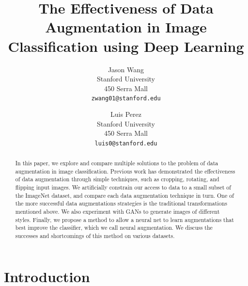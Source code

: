 \documentclass[10pt,twocolumn,letterpaper]{article}
\begin{document}
\title{The Effectiveness of Data Augmentation in Image Classification using Deep Learning}

\author{Jason Wang\\
Stanford University\\
450 Serra Mall\\
{\tt\small zwang01@stanford.edu}
\and
Luis Perez\\
Stanford University\\
450 Serra Mall\\
{\tt\small luis0@stanford.edu}
}

\maketitle

\begin{abstract}
In this paper, we explore and compare multiple solutions to the problem of data augmentation in image classification. Previous work has demonstrated the effectiveness of data augmentation through simple techniques, such as cropping, rotating, and flipping input images. We artificially constrain our access to data to a small subset of the ImageNet dataset, and compare each data augmentation technique in turn. One of the more successful data augmentations strategies is the traditional transformations mentioned above. We also experiment with GANs to generate images of different styles. Finally, we propose a method to allow a neural net to learn augmentations that best improve the classifier, which we call neural augmentation. We discuss the successes and shortcomings of this method on various datasets. 

\end{abstract}

\section{Introduction}

\end{document}
